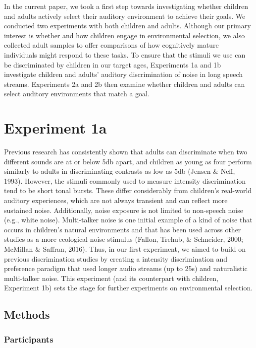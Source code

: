 \documentclass[10pt, letterpaper]{article}
\begin{document}
In the current paper, we took a first step towards investigating whether
children and adults actively select their auditory environment to
achieve their goals. We conducted two experiments with both children and
adults. Although our primary interest is whether and how children engage
in environmental selection, we also collected adult samples to offer
comparisons of how cognitively mature individuals might respond to these
tasks. To ensure that the stimuli we use can be discriminated by
children in our target ages, Experiments 1a and 1b investigate children
and adults' auditory discrimination of noise in long speech streams.
Experiments 2a and 2b then examine whether children and adults can
select auditory environments that match a goal.

\hypertarget{experiment-1a}{%
\section{Experiment 1a}\label{experiment-1a}}

Previous research has consistently shown that adults can discriminate
when two different sounds are at or below 5db apart, and children as
young as four perform similarly to adults in discriminating contrasts as
low as 5db (Jensen \& Neff, 1993). However, the stimuli commonly used to
measure intensity discrimination tend to be short tonal bursts. These
differ considerably from children's real-world auditory experiences,
which are not always transient and can reflect more sustained noise.
Additionally, noise exposure is not limited to non-speech noise (e.g.,
white noise). Multi-talker noise is one initial example of a kind of
noise that occurs in children's natural environments and that has been
used across other studies as a more ecological noise stimulus (Fallon,
Trehub, \& Schneider, 2000; McMillan \& Saffran, 2016). Thus, in our
first experiment, we aimed to build on previous discrimination studies
by creating a intensity discrimination and preference paradigm that used
longer audio streams (up to 25s) and naturalistic multi-talker noise.
This experiment (and its counterpart with children, Experiment 1b) sets
the stage for further experiments on environmental selection.

\hypertarget{methods}{%
\subsection{Methods}\label{methods}}

\hypertarget{participants}{%
\subsubsection{Participants}\label{participants}}
\end{document}

